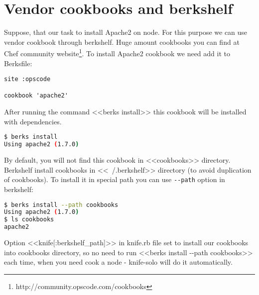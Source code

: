 \section{Vendor cookbooks and berkshelf}

Suppose, that our task to install Apache2 on node. For this purpose we can use vendor cookbook through berkshelf. Huge amount cookbooks you can find at Chef community website\footnote{http://community.opscode.com/cookbooks}. To install Apache2 cookbook we need add it to Berksfile:

\begin{lstlisting}[label=lst:my-cloud-berkshelf1,title=my-cloud/Berksfile]
site :opscode

cookbook 'apache2'
\end{lstlisting}

After running the command <<berks install>> this cookbook will be installed with dependencies.

\begin{lstlisting}[language=Bash,label=lst:my-cloud-berkshelf2,title=my-cloud/Berksfile]
$ berks install
Using apache2 (1.7.0)
\end{lstlisting}

By default, you will not find this cookbook in <<cookbooks>> directory. Berkshelf install cookbooks in <<~/.berkshelf>> directory (to avoid duplication of cookbooks). To install it in special path you can use \texttt{-\--path} option in berkshelf:

\begin{lstlisting}[language=Bash,label=lst:my-cloud-berkshelf3,title=my-cloud/Berksfile]
$ berks install --path cookbooks
Using apache2 (1.7.0)
$ ls cookbooks
apache2
\end{lstlisting}

Option <<knife[:berkshelf\_path]>> in knife.rb file set to install our cookbooks into cookbooks directory, so no need to run <<berks install -\--path cookbooks>> each time, when you need cook a node - knife-solo will do it automatically.

